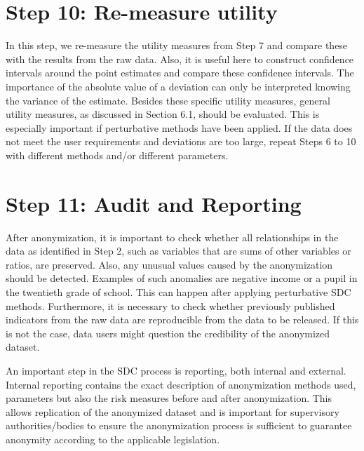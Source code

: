 \documentclass[letterpaper,10pt,english]{sphinxmanual}
\begin{document}
\section{Step 10: Re-measure utility}
\label{\detokenize{process:step-10-re-measure-utility}}
In this step, we re-measure the utility measures from Step 7 and compare
these with the results from the raw data. Also, it is useful here to
construct confidence intervals around the point estimates and compare
these confidence intervals. The importance of the absolute value of a
deviation can only be interpreted knowing the variance of the estimate.
Besides these specific utility measures, general utility measures, as
discussed in Section 6.1, should be evaluated. This is especially
important if perturbative methods have been applied. If the data does
not meet the user requirements and deviations are too large, repeat
Steps 6 to 10 with different methods and/or different parameters.


\section{Step 11: Audit and Reporting}
\label{\detokenize{process:step-11-audit-and-reporting}}
After anonymization, it is important to check whether all relationships
in the data as identified in Step 2, such as variables that are sums of
other variables or ratios, are preserved. Also, any unusual values
caused by the anonymization should be detected. Examples of such
anomalies are negative income or a pupil in the twentieth grade of
school. This can happen after applying perturbative SDC methods.
Furthermore, it is necessary to check whether previously published
indicators from the raw data are reproducible from the data to be
released. If this is not the case, data users might question the
credibility of the anonymized dataset.

An important step in the SDC process is reporting, both internal and
external. Internal reporting contains the exact description of
anonymization methods used, parameters but also the risk measures before
and after anonymization. This allows replication of the anonymized
dataset and is important for supervisory authorities/bodies to ensure
the anonymization process is sufficient to guarantee anonymity according
to the applicable legislation.
\end{document}
